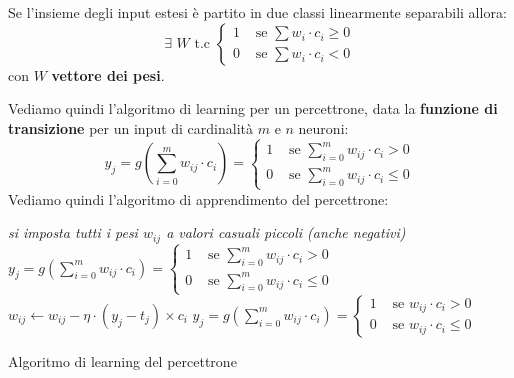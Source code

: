 \documentclass[a4paper,12pt, oneside]{book}
\begin{document}
\begin{teorema}
  Se l'insieme degli input estesi è partito in due classi linearmente separabili
  allora:
  \[\exists\,\,W\mbox{ t.c }
    \begin{cases}
      1 &\mbox{ se } \sum w_i\cdot c_i \geq 0\\
      0 &\mbox{ se } \sum w_i\cdot c_i < 0
    \end{cases}
  \]
  con $W$ \textbf{vettore dei pesi}.
\end{teorema}
Vediamo quindi l'algoritmo di learning per un percettrone, data la
\textbf{funzione di transizione} per un input di cardinalità $m$ e $n$ neuroni:
\[
  y_j=g\left(\sum_{i=0}^m w_{ij}\cdot c_i \right)=
  \begin{cases}
    1 &\mbox{ se } \sum_{i=0}^m w_{ij}\cdot c_i > 0\\
    0 &\mbox{ se } \sum_{i=0}^m w_{ij}\cdot c_i \leq 0
  \end{cases}
\]
Vediamo quindi l'algoritmo di apprendimento del percettrone:
\begin{algorithm}[H]
  \begin{algorithmic}
    \State \textit{\color{gray}{\# Inizializzazione}}
    \State \textit{si imposta tutti i pesi $w_{ij}$ a valori casuali piccoli
    (anche negativi)}
    \State \textit{\color{gray}{\# Training}}
    \State \small{}
    \State \small{} 
    \State $y_j=g\left(\sum_{i=0}^m w_{ij}\cdot c_i \right)=
    \begin{cases} 1
      &\mbox{ se } \sum_{i=0}^m w_{ij}\cdot c_i > 0\\ 0 &\mbox{ se }
      \sum_{i=0}^m w_{ij}\cdot c_i \leq 0
    \end{cases}$ 
    \State $w_{ij}\gets w_{ij}-\eta\cdot(y_j-t_j)\times c_i$
    \EndFor
    \EndFor
    \State \small{} 
    \State $y_j=g\left(\sum_{i=0}^m w_{ij}\cdot c_i \right)=
    \begin{cases} 1
      &\mbox{ se } w_{ij}\cdot c_i > 0\\ 0 &\mbox{ se }
      w_{ij}\cdot c_i \leq 0
    \end{cases}$
    \EndFunction
  \end{algorithmic}
  \caption{Algoritmo di learning del percettrone}
\end{algorithm}
\end{document}
